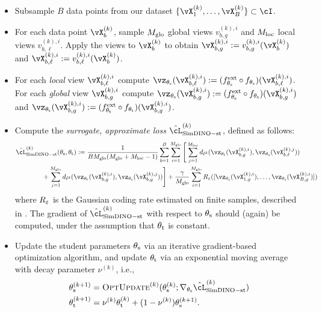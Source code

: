\documentclass[../../book-main.tex]{subfiles}
\begin{document}
\begin{itemize}
    \item Subsample \(B\) data points from our dataset \(\{\vX_{1}^{(k)}, \dots, \vX_{B}^{(k)}\} \subset \cI\).
    \item For each data point \(\vX_{b}^{(k)}\), sample \(M_{\mathrm{glo}}\) global views \(v_{b, g}^{(k), i}\) and \(M_{\mathrm{loc}}\) local views \(v_{b, \ell}^{(k), i}\). Apply the views to \(\vX_{b}^{(k)}\) to obtain \(\vX_{b, g}^{(k), i} := v_{b, g}^{(k), i}(\vX_{b}^{(k)})\) and \(\vX_{b, \ell}^{(k), i} := v_{b, \ell}^{(k), i}(\vX_{b}^{(k)})\).
    \item For each \textit{local} view \(\vX_{b, \ell}^{(k), i}\) compute \(\vz_{\theta_{\student}}(\vX_{b, \ell}^{(k), i}) := (f_{\theta_{\student}}^{\ext} \circ f_{\theta_{\student}})(\vX_{b, \ell}^{(k), i})\). For each \textit{global} view \(\vX_{b, g}^{(k), i}\) compute \(\vz_{\theta_{\student}}(\vX_{b, g}^{(k), i}) := (f_{\theta_{\student}}^{\ext} \circ f_{\theta_{\student}})(\vX_{b, g}^{(k), i})\) and \(\vz_{\theta_{\teacher}}(\vX_{b, g}^{(k), i}) := (f_{\theta_{\teacher}}^{\ext} \circ f_{\theta_{\teacher}})(\vX_{b, g}^{(k), i})\).
    \item Compute the \textit{surrogate, approximate loss} \(\hat{\cL}_{\simdino-\student\teacher}^{(k)}\), defined as follows: 
    \begin{align}\label{eq:simdino_loss_teacherstudent_empirical}
        &\hat{\cL}_{\simdino{}-\student\teacher}^{(k)}(\theta_{\student}, \theta_{\teacher}) :=
        \frac{1}{BM_{\glo}(M_{\glo} + M_{\loc} - 1)}\sum_{b = 1}^{B}\sum_{i = 1}^{M_{\glo}}\Bigg[\sum_{j = 1}^{M_{\loc}}d_{\ell^{2}}(\vz_{\theta_{\teacher}}(\vX_{b, g}^{(k), i}), \vz_{\theta_{\student}}(\vX_{b, \ell}^{(k), j})) \\ 
        &\qquad \qquad + \sum_{j = 1}^{M_{\glo}}d_{\ell^{2}}(\vz_{\theta_{\teacher}}(\vX_{b, g}^{(k), i}), \vz_{\theta_{\student}}(\vX_{b, g}^{(k), j}))\Bigg] + \frac{\gamma}{M_{\glo}}\sum_{i = 1}^{M_{\glo}}R_{\eps}([\vz_{\theta_{\student}}(\vX_{1, g}^{(k), i}), \dots, \vz_{\theta_{\student}}(\vX_{B, g}^{(k), i})])\nonumber
    \end{align}
    where \(R_{\varepsilon}\) is the Gaussian coding rate estimated on finite samples, described in . The gradient of \(\hat{\cL}_{\simdino-\student\teacher}^{(k)}\) with respect to \(\theta_{\mathrm{s}}\) should (again) be computed, under the assumption that \(\theta_{\mathrm{t}}\) is constant.
    \item Update the student parameters \(\theta_{\mathrm{s}}\) via an iterative gradient-based optimization algorithm, and update \(\theta_{\mathrm{t}}\) via an exponential moving average with decay parameter \(\nu^{(k)}\), i.e., 
    \begin{align}
        \theta_{\student}^{(k + 1)}
        &= \textsc{OptUpdate}^{(k)}(\theta_{\student}^{(k)}; \nabla_{\theta_{\student}}\hat{\cL}_{\simdino-\student\teacher}^{(k)}) \\
        \theta_{\teacher}^{(k + 1)}
        &= \nu^{(k)}\theta_{\teacher}^{(k)} + (1 - \nu^{(k)})\theta_{\student}^{(k + 1)}.
    \end{align}
\end{itemize}
\end{document}
